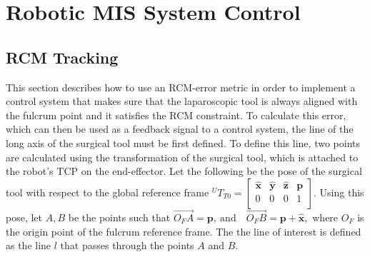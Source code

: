 \chapter{Robotic MIS System Control}

\section{RCM Tracking}
\label{section:rcm-tracking}

This section describes how to use an RCM-error metric in order to implement a control system that makes sure that the laparoscopic tool is always aligned with the fulcrum point and it satisfies the RCM 
constraint. To calculate this error, which can then be used as a feedback signal to a control system, the line of the long axis of the surgical tool must be first defined. To define this line, two points are  calculated using the transformation of the surgical tool, which is attached to the robot's TCP on the end-effector. Let the following be the pose of the surgical tool with respect to the global reference frame
$
{}^UT_{T0} = \begin{bmatrix}
\mathbf{\hat{x}} & \mathbf{\hat{y}} & \mathbf{\hat{z}} & \mathbf{p} \\
0                & 0                & 0                & 1 \\
\end{bmatrix}.
$
Using this pose, let $A,B$ be the points such that 
$
\overrightarrow{O_FA} = \mathbf{p},~ \textrm{and} \quad \overrightarrow{O_FB} = \mathbf{p} + \mathbf{\hat{x}}, 
$
where $O_F$ is the origin point of the fulcrum reference frame. The the line of interest is defined as the line $l$ that passes through the points $A$ and $B$. \\

